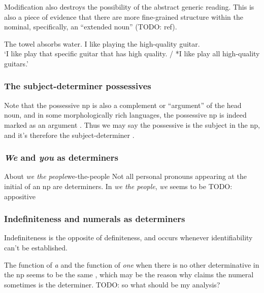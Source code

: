 \documentclass[UTF8, a4paper, oneside, scheme=plain, 12pt]{ctexbook}
\newcommand*{\citesec}[1]{\S~{#1}}
\newcommand*{\citepage}[1]{p.~{#1}}
\newcommand{\form}[1]{\emph{#1}}
\newcommand{\translate}[1]{`#1'}
\begin{document}
Modification also destroys the possibility of the abstract generic reading.
This is also a piece of evidence that 
there are more fine-grained structure within the nominal,
specifically, an ``extended noun'' (TODO: ref).

\begin{exe}
    \ex *The towel absorbs water.
    \ex I like playing the high-quality guitar. \\
    \translate{I like play that specific guitar that has high quality.
    / *I like play all high-quality guitars.}
\end{exe}

\subsubsection{The subject-determiner possessives}

Note that the possessive \acs{np} is also a complement or ``argument''
of the head noun,
and in some morphologically rich languages,
the possessive \acs{np} is indeed marked as an argument 
\citep[\citesec{5.1.2.1}]{jacques2021grammar}.
Thus we may say the possessive is the subject in the \acs{np},
and it's therefore the subject-determiner \citep[\citepage{467}]{cgel}.

\subsubsection{\form{We} and \form{you} as determiners}

\begin{infobox}{About \form{we the people}}{we-the-people}
    Not all personal pronouns appearing at the initial of an \acs{np}
    are determiners.
    In \form{we the people}, 
    \form{we} seems to be TODO: appositive
\end{infobox}

\subsubsection{Indefiniteness and numerals as determiners}

Indefiniteness is the opposite of definiteness,
and occurs whenever identifiability can't be established.

The function of \form{a} 
and the function of \form{one} when there is no other determinative in the \acs{np}
seems to be the same \citep[\citepage{372}]{cgel},
which may be the reason why \citet[\citepage{385}]{cgel} claims 
the numeral sometimes is the determiner. TODO: so what should be my analysis?
\end{document}
